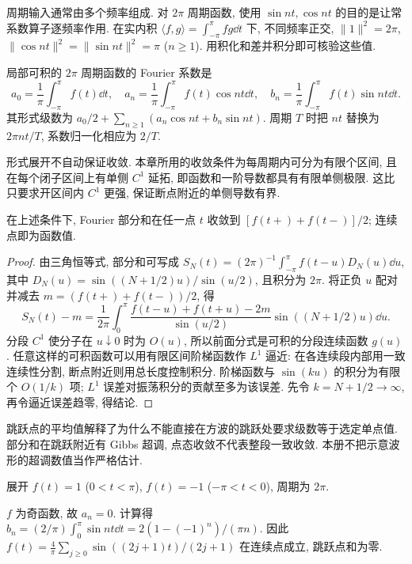 周期输入通常由多个频率组成. 对 $2\pi$ 周期函数, 使用 $\sin nt,\cos nt$ 的目的是让常系数算子逐频率作用. 在实内积 $\langle f,g\rangle=\int_{-\pi}^{\pi}fg\dd t$ 下, 不同频率正交, $\|1\|^2=2\pi$, $\|\cos nt\|^2=\|\sin nt\|^2=\pi$ ($n\ge1$). 用积化和差并积分即可核验这些值.
\begin{definition}
局部可积的 $2\pi$ 周期函数的 Fourier 系数是
\[
a_0=\frac1\pi\int_{-\pi}^{\pi}f(t)\dd t,\quad
 a_n=\frac1\pi\int_{-\pi}^{\pi}f(t)\cos nt\dd t,\quad
 b_n=\frac1\pi\int_{-\pi}^{\pi}f(t)\sin nt\dd t.
\]
其形式级数为 $a_0/2+\sum_{n\ge1}(a_n\cos nt+b_n\sin nt)$. 周期 $T$ 时把 $nt$ 替换为 $2\pi nt/T$, 系数归一化相应为 $2/T$.
\end{definition}
形式展开不自动保证收敛. 本章所用的收敛条件为每周期内可分为有限个区间, 且在每个闭子区间上有单侧 $C^1$ 延拓, 即函数和一阶导数都具有有限单侧极限. 这比只要求开区间内 $C^1$ 更强, 保证断点附近的单侧导数有界.
\begin{theorem}
在上述条件下, Fourier 部分和在任一点 $t$ 收敛到 $[f(t+)+f(t-)]/2$; 连续点即为函数值.
\end{theorem}
\begin{proof}
由三角恒等式, 部分和可写成 $S_N(t)=(2\pi)^{-1}\int_{-\pi}^{\pi}f(t-u)D_N(u)\dd u$, 其中 $D_N(u)=\sin((N+1/2)u)/\sin(u/2)$, 且积分为 $2\pi$. 将正负 $u$ 配对并减去 $m=(f(t+)+f(t-))/2$, 得
\[
S_N(t)-m=\frac1{2\pi}\int_0^\pi
\frac{f(t-u)+f(t+u)-2m}{\sin(u/2)}\sin((N+1/2)u)\dd u.
\]
分段 $C^1$ 使分子在 $u\downarrow0$ 时为 $O(u)$, 所以前面分式是可积的分段连续函数 $g(u)$. 任意这样的可积函数可以用有限区间阶梯函数作 $L^1$ 逼近: 在各连续段内部用一致连续性分割, 断点附近则用总长度控制积分. 阶梯函数与 $\sin(ku)$ 的积分为有限个 $O(1/k)$ 项; $L^1$ 误差对振荡积分的贡献至多为该误差. 先令 $k=N+1/2\to\infty$, 再令逼近误差趋零, 得结论.
\end{proof}
跳跃点的平均值解释了为什么不能直接在方波的跳跃处要求级数等于选定单点值. 部分和在跳跃附近有 Gibbs 超调, 点态收敛不代表整段一致收敛. 本册不把示意波形的超调数值当作严格估计.
\begin{example}展开 $f(t)=1$ ($0<t<\pi$), $f(t)=-1$ ($-\pi<t<0$), 周期为 $2\pi$.\end{example}
\begin{solution}
$f$ 为奇函数, 故 $a_n=0$. 计算得 $b_n=(2/\pi)\int_0^\pi\sin nt\dd t=2(1-(-1)^n)/(\pi n)$. 因此
$f(t)=\frac4\pi\sum_{j\ge0}\sin((2j+1)t)/(2j+1)$ 在连续点成立, 跳跃点和为零.
\end{solution}
